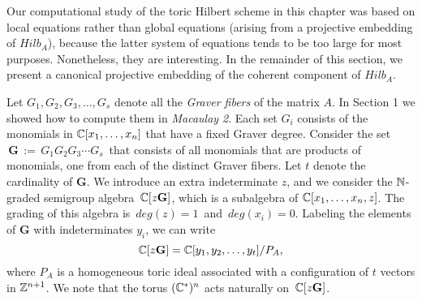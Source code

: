 Our computational study of the toric Hilbert scheme in this
chapter was based on local equations rather than
global equations (arising from a projective embedding of  $Hilb_A$),
because the latter system of equations tends to be too large 
for most purposes. Nonetheless, they are interesting.
In the remainder of this section, we present a canonical 
projective embedding of the coherent component of $Hilb_A$.

Let $G_1, G_2, G_3, \ldots, G_s$ denote all the {\it Graver fibers} of
the matrix $A$. In Section 1 we showed how to compute them in 
{\sl Macaulay 2}. Each
set $G_i$ consists of the monomials in $\mathbb{C}[x_1,\ldots,x_n]$ 
that have a fixed Graver degree.  Consider the set $\, {\mathbf G} \,
:= \, G_1 G_2 G_3 \cdots G_s \,$ that consists of all monomials that
are products of monomials, one from each of the distinct Graver
fibers. Let $t$ denote the cardinality of ${\mathbf G}$.  We introduce
an extra indeterminate $z$, and we consider the $\mathbb{N}$-graded semigroup
algebra $\,\mathbb{C}[z {\mathbf G}] $, which is a subalgebra of
$\mathbb{C}[x_1,\ldots,x_n,z]$. The grading of this algebra is $\,deg(z) = 1\,$ and
$\, deg(x_i) = 0$. Labeling the elements of ${\mathbf G}$ with
indeterminates $y_i$, we can write
$$ \mathbb{C}[z {\mathbf G}]   = 
\mathbb{C}[y_1,y_2,\ldots,y_t]/P_A, $$
where $P_A$ is a homogeneous toric ideal
associated with a configuration of $t$ vectors in $\mathbb{Z}^{n+1}$.
We note that the torus $(\mathbb{C}^*)^n$ acts naturally on 
$\, \mathbb{C}[z {\mathbf G}]$.

